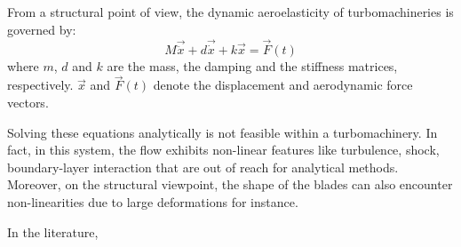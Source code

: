
From a structural point of view, the dynamic aeroelasticity
of turbomachineries is governed by:
\begin{equation}
	M \vec{\ddot{x}} + d \vec{\dot{x}} + k \vec{x} = \vec{F}(t)
	\label{eq:ael_motion_eq}
\end{equation}
where $m$, $d$ and $k$ are the mass, the damping 
and the stiffness matrices, respectively.
$\vec{x}$ and $\vec{F}(t)$ denote the displacement 
and aerodynamic force vectors.

Solving these equations analytically is not feasible
within a turbomachinery. In fact, in this system, 
the flow exhibits non-linear features like turbulence, shock,
boundary-layer interaction that are out of reach for
analytical methods. Moreover, on the structural viewpoint,
the shape of the blades can also encounter non-linearities
due to large deformations for instance.

In the literature, 